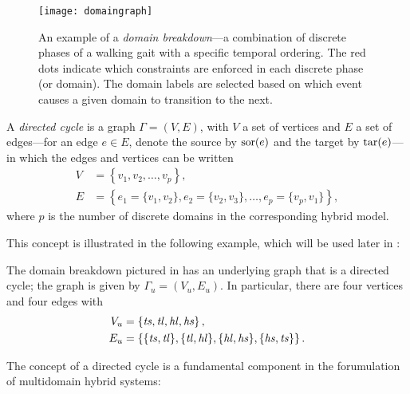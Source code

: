 \begin{figure}[t]
  \centering
  \texttt{[image: domaingraph]}
  \caption{An example of a {\em domain breakdown}---a combination of discrete phases of a walking gait with a specific temporal ordering. The red dots indicate which constraints are enforced in each discrete phase (or domain). The domain labels are selected based on which event causes a given domain to transition to the next.}
  \label{fig:domaingraph}
\end{figure}

\begin{definition}
  A {\em directed cycle} is a graph $\Gamma = (V, E)$, with $V$ a set of vertices and $E$ a set of edges---for an edge $e \in E$, denote the source by $\mathrm{sor}(e)$ and the target by $\mathrm{tar}(e)$---in which the edges and vertices can be written
  \begin{align}
    \nonumber
    V &= \left\{v_{1}, v_{2}, \ldots, v_{p}\right\},\\
    \label{eqn:directedcyclep}
    E &= \left\{e_{1} = \{v_{1}, v_{2}\}, e_{2} = \{v_{2}, v_{3}\}, \ldots, e_{p} = \{v_{p}, v_{1}\}\right\},
  \end{align}
  where $p$ is the number of discrete domains in the corresponding hybrid model.
\end{definition}

This concept is illustrated in the following example, which will be used later in :

\begin{exmp} \label{universalgraph}
  The domain breakdown pictured in  has an underlying graph that is a directed cycle;
  the graph is given by $\Gamma_{u} = (V_{u}, E_{u})$.
  In particular, there are four vertices and four edges with
  \begin{align}
    \nonumber
    V_u &= \left\{\mathit{ts}, \mathit{tl}, \mathit{hl}, \mathit{hs}\right\},\\
    E_u &= \left\{\{\mathit{ts}, \mathit{tl}\}, \{\mathit{tl}, \mathit{hl}\}, \{\mathit{hl}, \mathit{hs}\}, \{\mathit{hs}, \mathit{ts}\}\right\}.
  \end{align}
\end{exmp}

The concept of a directed cycle is a fundamental component in the forumulation of multidomain hybrid systems:

